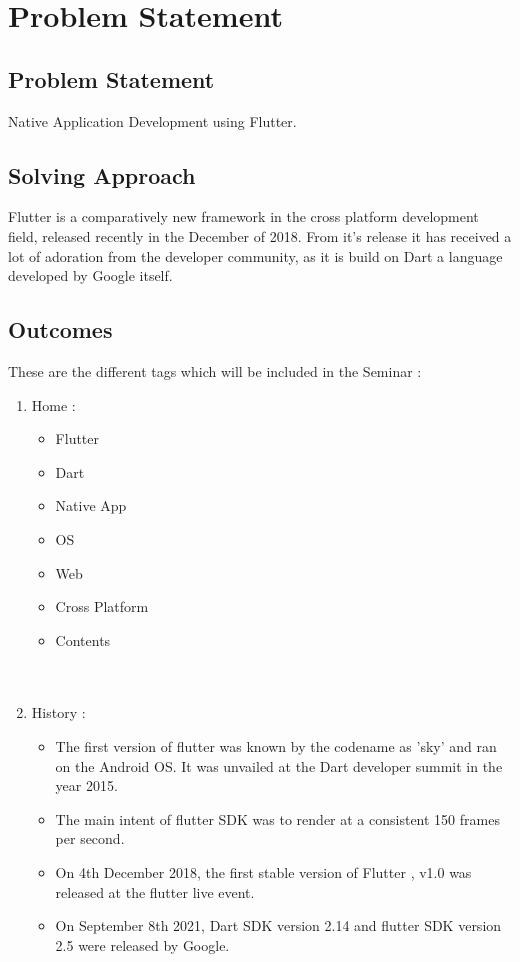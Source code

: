 \documentclass[11pt,a4paper,oneside,openright]{report}
\begin{document}
{{\chapter{Problem Statement}\label{chap:project outline}

\section{Problem Statement}
 Native Application Development using Flutter.
\section{Solving Approach}
	Flutter is a comparatively new framework in the cross platform development field, released recently in the December of 2018. From it's release it has received a lot of adoration from the developer community, as it is build on Dart a language developed by Google itself.  

\section{Outcomes}
\hspace{0.5in} These are the different tags which will be included in the Seminar :
\begin{enumerate}
\item Home :
\begin{itemize}
\item Flutter
\item Dart
\item Native App
\item OS
\item Web
\item Cross Platform
\item Contents\\
\\
\\
\end{itemize}
\item History :  
	\begin{itemize}
	\item The first version of flutter was known by the codename as 'sky' and ran on the Android OS. It was unvailed at the Dart developer summit in the year 2015.
	\item The main intent of flutter SDK was to render at a consistent 150 frames per second.
	\item On 4th December 2018, the first stable version of Flutter , v1.0 was released at the flutter live event.
	\item On September 8th 2021, Dart SDK version 2.14 and flutter SDK version 2.5 were released by Google.
	\end{itemize}


\end{enumerate}}}
\end{document}
